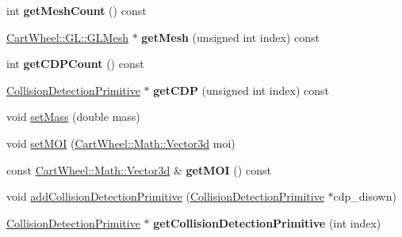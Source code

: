 \begin{DoxyCompactItemize}
\item 
\hypertarget{classCartWheel_1_1Physics_1_1RigidBody_a52502bff86e85ffe0ca148c4d7466905}{
int {\bfseries getMeshCount} () const }
\label{classCartWheel_1_1Physics_1_1RigidBody_a52502bff86e85ffe0ca148c4d7466905}

\item 
\hypertarget{classCartWheel_1_1Physics_1_1RigidBody_a41a6333cfa2bb0de913a18069704c1a5}{
\hyperlink{classCartWheel_1_1GL_1_1GLMesh}{CartWheel::GL::GLMesh} $\ast$ {\bfseries getMesh} (unsigned int index) const }
\label{classCartWheel_1_1Physics_1_1RigidBody_a41a6333cfa2bb0de913a18069704c1a5}

\item 
\hypertarget{classCartWheel_1_1Physics_1_1RigidBody_a5ec782bf454a2973c41ce9d3ddcb84d5}{
int {\bfseries getCDPCount} () const }
\label{classCartWheel_1_1Physics_1_1RigidBody_a5ec782bf454a2973c41ce9d3ddcb84d5}

\item 
\hypertarget{classCartWheel_1_1Physics_1_1RigidBody_af1b5b6106f66a8dae074192f054fa626}{
\hyperlink{classCartWheel_1_1Physics_1_1CollisionDetectionPrimitive}{CollisionDetectionPrimitive} $\ast$ {\bfseries getCDP} (unsigned int index) const }
\label{classCartWheel_1_1Physics_1_1RigidBody_af1b5b6106f66a8dae074192f054fa626}

\item 
void \hyperlink{classCartWheel_1_1Physics_1_1RigidBody_ac3cefd3c64d69b3fd4ed991f93639e1c}{setMass} (double mass)
\item 
void \hyperlink{classCartWheel_1_1Physics_1_1RigidBody_a80cf4479818fd2cecf88b30ea4602e7f}{setMOI} (\hyperlink{classCartWheel_1_1Math_1_1Vector3d}{CartWheel::Math::Vector3d} moi)
\item 
\hypertarget{classCartWheel_1_1Physics_1_1RigidBody_a1694f538b67ca0c46098a28e372e64ef}{
const \hyperlink{classCartWheel_1_1Math_1_1Vector3d}{CartWheel::Math::Vector3d} \& {\bfseries getMOI} () const }
\label{classCartWheel_1_1Physics_1_1RigidBody_a1694f538b67ca0c46098a28e372e64ef}

\item 
void \hyperlink{classCartWheel_1_1Physics_1_1RigidBody_a132c2940ca25348ce6188de62eb7f670}{addCollisionDetectionPrimitive} (\hyperlink{classCartWheel_1_1Physics_1_1CollisionDetectionPrimitive}{CollisionDetectionPrimitive} $\ast$cdp\_\-disown)
\item 
\hypertarget{classCartWheel_1_1Physics_1_1RigidBody_a6c07768bc24c6bc2f683a1c058f59892}{
\hyperlink{classCartWheel_1_1Physics_1_1CollisionDetectionPrimitive}{CollisionDetectionPrimitive} $\ast$ {\bfseries getCollisionDetectionPrimitive} (int index)}
\label{classCartWheel_1_1Physics_1_1RigidBody_a6c07768bc24c6bc2f683a1c058f59892}


\end{DoxyCompactItemize}
